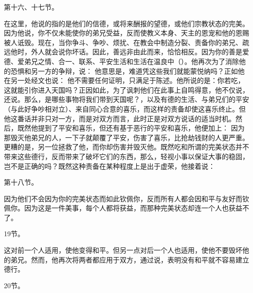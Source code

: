 第十六、十七节。  \par

在这里，他说的指的是他们的信德，或将来酬报的望德，或他们宗教状态的完美。因为他说，你不仅未能使你的弟兄受益，反而使教义本身、天主的恩宠和他的恩赐被人诋毁。现在，当你争斗、争吵、烦扰、在教会中制造分裂、责备你的弟兄、疏远他时，外人就会说你坏话。因此，善远非由此而来，恰恰相反。因为你的善是爱德、爱弟兄之情、合一、联系、平安生活和生活在温良中（）。他再次为了消除他的恐惧和另一方的争辩，说： 他意思是，难道凭这些我们就能蒙悦纳吗？正如他在另一处经文也说： 他不需要任何证明，只满足于陈述。他所说的是：你若吃，这就能引你进入天国吗？正因如此，为了讽刺他们在此事上自鸣得意，他不仅说，还说。那么，是哪些事物将我们带到天国呢？，以及有德的生活、与弟兄们的平安（与此好争吵相对立）、来自同心合意的喜乐，而这样的责备却使这喜乐终止。但他这番话并非只对一方，而是对双方而言，此时正是对双方说话的适当时机。然后，既然他提到了平安和喜乐，但还有基于恶行的平安和喜乐，他便加上： 因为那毁灭他弟兄的人，一下子就颠覆了平安，伤害了喜乐，比抢劫钱财的人更严重。更糟的是，另一位拯救了他，而你却伤害并毁灭他。既然吃和所谓的完美状态并不带来这些德行，反而带来了破坏它们的东西，那么，轻视小事以保证大事的稳固，岂不是正确的吗？既然这种责备在某种程度上是出于虚荣，他接着说：\par

第十八节。 \par

因为他们不会因为你的完美状态而如此钦佩你，反而所有人都会因和平与友好而钦佩你。因为这是一件美事，每个人都将获益，而那种完美状态却连一个人也获益不了。\par

19节。\par

这对前一个人适用，使他变得和平。但另一点对后一个人也适用，使他不要毁坏他的弟兄。然而，他再次将两者都应用于双方，通过说，表明没有和平就不容易建立德行。\par

20节。\par

